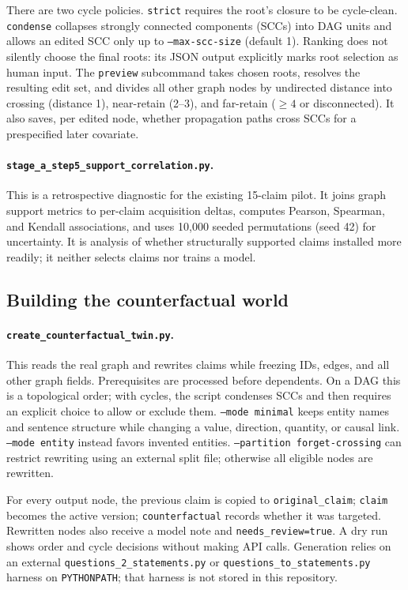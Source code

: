 \documentclass[11pt]{article}
\begin{document}
There are two cycle policies.  \texttt{strict} requires the root's closure to be
cycle-clean.  \texttt{condense} collapses strongly connected components (SCCs)
into DAG units and allows an edited SCC only up to \texttt{--max-scc-size}
(default 1).  Ranking does not silently choose the final roots: its JSON output
explicitly marks root selection as human input.  The \texttt{preview}
subcommand takes chosen roots, resolves the resulting edit set, and divides all
other graph nodes by undirected distance into crossing (distance 1), near-retain
(2--3), and far-retain ($\geq4$ or disconnected).  It also saves, per edited
node, whether propagation paths cross SCCs for a prespecified later covariate.

\paragraph{\texttt{stage\_a\_step5\_support\_correlation.py}.}
This is a retrospective diagnostic for the existing 15-claim pilot.  It joins
graph support metrics to per-claim acquisition deltas, computes Pearson,
Spearman, and Kendall associations, and uses 10,000 seeded permutations
(seed 42) for uncertainty.  It is analysis of whether structurally supported
claims installed more readily; it neither selects claims nor trains a model.

\subsection{Building the counterfactual world}

\paragraph{\texttt{create\_counterfactual\_twin.py}.}
This reads the real graph and rewrites claims while freezing IDs, edges, and all
other graph fields.  Prerequisites are processed before dependents.  On a DAG
this is a topological order; with cycles, the script condenses SCCs and then
requires an explicit choice to allow or exclude them.  \texttt{--mode minimal}
keeps entity names and sentence structure while changing a value, direction,
quantity, or causal link.  \texttt{--mode entity} instead favors invented
entities.  \texttt{--partition forget-crossing} can restrict rewriting using an
external split file; otherwise all eligible nodes are rewritten.

For every output node, the previous claim is copied to
\texttt{original\_claim}; \texttt{claim} becomes the active version;
\texttt{counterfactual} records whether it was targeted.  Rewritten nodes also
receive a model note and \texttt{needs\_review=true}.  A dry run shows order and
cycle decisions without making API calls.  Generation relies on an external
\texttt{questions\_2\_statements.py} or
\texttt{questions\_to\_statements.py} harness on \texttt{PYTHONPATH}; that
harness is not stored in this repository.
\end{document}
